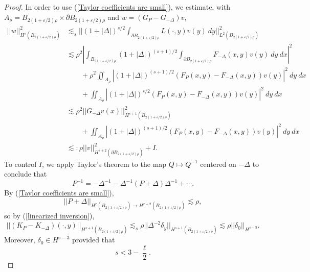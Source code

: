 \documentclass[reqno,12pt,letterpaper]{amsart}
\theoremstyle{definition}
\numberwithin{equation}{section}
\begin{document}
\begin{proof}
In order to use (\ref{Taylor coefficients are small}), we estimate, with $A_\rho = B_{2(1 + \varepsilon/2)\rho} \times \partial B_{2(1 + \varepsilon/2)\rho}$ and $w = (G_P - G_{-\Delta})v$,
\begin{align*}
||w||_{H^s(B_{2(1 + \varepsilon/2)\rho})}^2 &\lesssim_s ||(1 + |\Delta|)^{s/2} \int_{\partial B_{2(1 + \varepsilon/2)\rho}} L(\cdot, y) v(y) ~dy||_{L^2(B_{2(1 + \varepsilon/2)\rho})}^2\\
&\lesssim \rho^2 \left|\int_{B_{2(1 + \varepsilon/2)\rho}} (1 + |\Delta|)^{(s+1)/2} \int_{\partial B_{2(1 + \varepsilon/2)\rho}} F_{-\Delta}(x, y) v(y) ~dy ~dx\right|^2 \\
&\qquad + \rho^2 \iint_{A_\rho} |(1 + |\Delta|)^{(s+1)/2} (F_P(x, y) - F_{-\Delta}(x, y)) v(y)|^2 ~dy ~dx \\
&\qquad + \iint_{A_\rho} |(1 + |\Delta|)^{s/2} (F_P(x, y) - F_{-\Delta}(x, y)) v(y)|^2 ~dy ~dx \\
&\lesssim \rho^2 ||G_{-\Delta}v(x)||_{H^{s+1}(B_{2(1 + \varepsilon/2)\rho})}^2\\
&\qquad + \iint_{A_\rho} |(1 + |\Delta|)^{(s+1)/2} (F_P(x, y) - F_{-\Delta}(x, y)) v(y)|^2 ~dy ~dx\\
&\lesssim: \rho ||v||_{H^{s + 2}(\partial B_{2(1 + \varepsilon/2)\rho})}^2 + I.
\end{align*}
To control $I$, we apply Taylor's theorem to the map $Q \mapsto Q^{-1}$ centered on $-\Delta$ to conclude that
\begin{equation}\label{linearized inversion}
P^{-1} = -\Delta^{-1} - \Delta^{-1}(P + \Delta)\Delta^{-1} + \cdots.
\end{equation}
By (\ref{Taylor coefficients are small}),
$$||P + \Delta||_{H^r(B_{2(1 + \varepsilon/2)\rho}) \to H^{r+2}(B_{2(1 + \varepsilon/2)\rho})} \lesssim \rho,$$
so by (\ref{linearized inversion}),
$$||(K_P - K_{-\Delta})(\cdot, y)||_{H^{s + 1}(B_{2(1 + \varepsilon/2)\rho})} \lesssim_s \rho ||\Delta^{-2} \delta_y||_{H^{s + 1}(B_{2(1 + \varepsilon/2)\rho})} \lesssim \rho ||\delta_0||_{H^{s-3}}.$$
Moreover, $\delta_0 \in H^{s - 3}$ provided that
\begin{equation}\label{delta regularity}
s < 3 - \frac{\ell}{2}.
\end{equation}


\end{proof}
\end{document}
